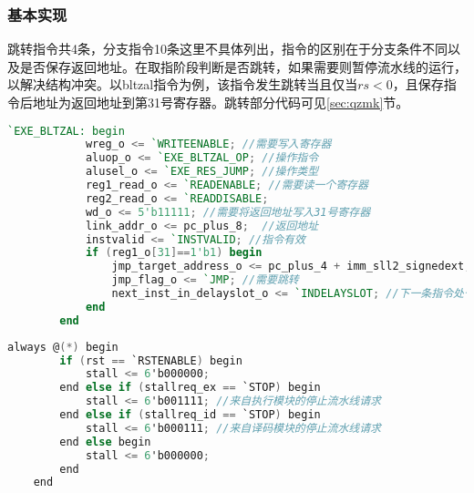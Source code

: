 \subsubsection{基本实现}
    跳转指令共4条，分支指令10条这里不具体列出，指令的区别在于分支条件不同以及是否保存返回地址。在取指阶段判断是否跳转，如果需要则暂停流水线的运行，以解决结构冲突。以bltzal指令为例，该指令发生跳转当且仅当$rs<0$，且保存指令后地址为返回地址到第31号寄存器。跳转部分代码可见\ref{sec:qzmk}节。
    \begin{lstlisting}[language=Verilog]
        `EXE_BLTZAL: begin
            wreg_o <= `WRITEENABLE; //需要写入寄存器
            aluop_o <= `EXE_BLTZAL_OP; //操作指令
            alusel_o <= `EXE_RES_JUMP; //操作类型
            reg1_read_o <= `READENABLE; //需要读一个寄存器
            reg2_read_o <= `READDISABLE;
            wd_o <= 5'b11111; //需要将返回地址写入31号寄存器
            link_addr_o <= pc_plus_8;  //返回地址
            instvalid <= `INSTVALID; //指令有效
            if (reg1_o[31]==1'b1) begin
                jmp_target_address_o <= pc_plus_4 + imm_sll2_signedext; //跳转地址和
                jmp_flag_o <= `JMP; //需要跳转
                next_inst_in_delayslot_o <= `INDELAYSLOT; //下一条指令处于延迟槽
            end
        end
    \end{lstlisting}
    \begin{lstlisting}[language=C]
    always @(*) begin
        if (rst == `RSTENABLE) begin
            stall <= 6'b000000;
        end else if (stallreq_ex == `STOP) begin 
            stall <= 6'b001111; //来自执行模块的停止流水线请求
        end else if (stallreq_id == `STOP) begin 
            stall <= 6'b000111; //来自译码模块的停止流水线请求
        end else begin
            stall <= 6'b000000;
        end
    end
    \end{lstlisting}

